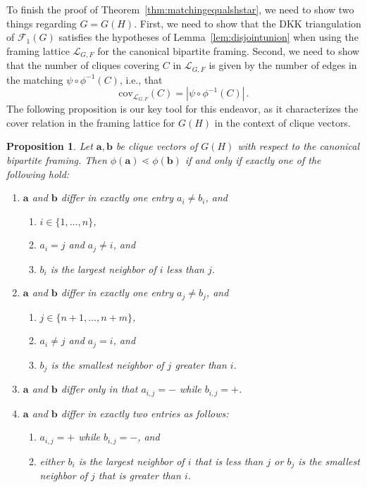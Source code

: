 \documentclass[12pt]{amsart}
\newtheorem{proposition}[theorem]{Proposition}
\theoremstyle{definition}
\newcommand\ba{\mathbf{a}}
\newcommand\bb{\mathbf{b}}
\newcommand\calF{\mathcal{F}}
\newcommand{\scrL}{\mathscr{L}}
\newcommand{\cov}{\mathrm{cov}}
\begin{document}
To finish the proof of Theorem~\ref{thm:matchingequalshstar}, we need to show two things regarding $G=G(H)$.
First, we need to show that the DKK triangulation of $\calF_1(G)$ satisfies the hypotheses of Lemma~\ref{lem:disjointunion} when using the framing lattice $\scrL_{G,F}$ for the canonical bipartite framing.
Second, we need to show that the number of cliques covering $C$ in $\scrL_{G,F}$ is given by the number of edges in the matching $\psi\circ\phi^{-1}(C)$, i.e., that
\[
\cov_{\scrL_{G,F}}(C)=|\psi\circ\phi^{-1}(C)| \, .
\]
The following proposition is our key tool for this endeavor, as it characterizes the cover relation in the framing lattice for $G(H)$ in the context of clique vectors.

\begin{proposition}\label{prop:cover}
    Let $\ba, \bb$ be clique vectors of $G(H)$ with respect to the canonical bipartite framing.
    Then $\phi(\ba) \lessdot \phi(\bb)$ if and only if exactly one of the following hold:
    \begin{enumerate}
        \item $\ba$ and $\bb$ differ in exactly one entry $a_i \neq b_i$, and
            \begin{enumerate}
                \item $i \in \{1,\dots,n\}$,
                \item $a_i = j$ and $a_j \neq i$, and
                \item $b_i$ is the largest neighbor of $i$ less than $j$.
            \end{enumerate}
        \item $\ba$ and $\bb$ differ in exactly one entry $a_j \neq b_j$, and
            \begin{enumerate}
                \item $j \in \{n+1,\dots,n+m\}$,
                \item $a_i \neq j$ and $a_j = i$, and
                \item $b_j$ is the smallest neighbor of $j$ greater than $i$.
            \end{enumerate}
        \item $\ba$ and $\bb$ differ only in that $a_{i,j} = -$ while $b_{i,j} = +$.
        \item $\ba$ and $\bb$ differ in exactly two entries as follows:
            \begin{enumerate}
                \item $a_{i,j} = +$ while $b_{i,j} = -$, and
                \item either $b_i$ is the largest neighbor of $i$ that is less than $j$ or $b_j$ is the smallest neighbor of $j$ that is greater than $i$.
            \end{enumerate}
    \end{enumerate}
\end{proposition}
\end{document}
